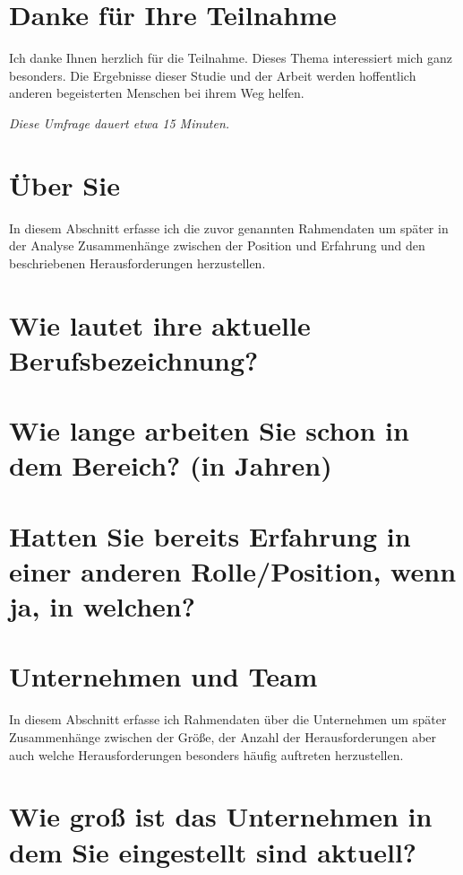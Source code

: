 \section*{Danke für Ihre Teilnahme}
Ich danke Ihnen herzlich für die Teilnahme. Dieses Thema interessiert mich ganz besonders. Die Ergebnisse dieser Studie und der Arbeit werden hoffentlich anderen begeisterten Menschen bei ihrem Weg helfen.

\textit{Diese Umfrage dauert etwa 15 Minuten.}

\section*{Über Sie}
In diesem Abschnitt erfasse ich die zuvor genannten Rahmendaten um später in der Analyse Zusammenhänge zwischen der Position und Erfahrung und den beschriebenen Herausforderungen herzustellen.

\section*{Wie lautet ihre aktuelle Berufsbezeichnung?}
\kurzantwort

\section*{Wie lange arbeiten Sie schon in dem Bereich? (in Jahren)}
\kurzantwort

\section*{Hatten Sie bereits Erfahrung in einer anderen Rolle/Position, wenn ja, in welchen?}
\kurzantwort

\section*{Unternehmen und Team}
In diesem Abschnitt erfasse ich Rahmendaten über die Unternehmen um später Zusammenhänge zwischen der Größe, der Anzahl der Herausforderungen aber auch welche Herausforderungen besonders häufig auftreten herzustellen.

\section*{Wie groß ist das Unternehmen in dem Sie eingestellt sind aktuell?}

